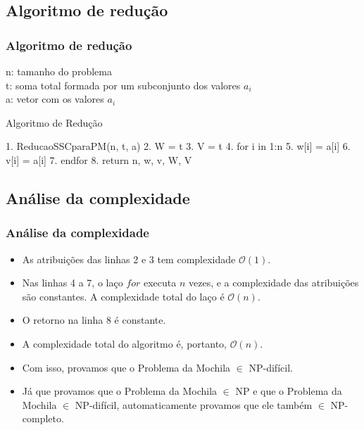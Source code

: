 \documentclass{beamer}
\begin{document}
\subsection{Algoritmo de redução}
\begin{frame}[fragile]
\frametitle{Algoritmo de redução}
    n: tamanho do problema \\
    t: soma total formada por um subconjunto dos valores $a_{i}$ \\
    a: vetor com os valores $a_{i}$ \\
    \begin{block}{Algoritmo de Redução}
        \begin{semiverbatim}
        1. ReducaoSSCparaPM(n, t, a)
        2.    W = t
        3.    V = t
        4.    for i in 1:n
        5.        w[i] = a[i]
        6.        v[i] = a[i]
        7.    endfor
        8.    return n, w, v, W, V
        \end{semiverbatim}
    \end{block}
\end{frame}


\subsection{Análise da complexidade}
\begin{frame}
\frametitle{Análise da complexidade}
    \begin{itemize}
        \item As atribuições das linhas 2 e 3 tem complexidade $\mathcal{O}(1)$.

        \item Nas linhas 4 a 7, o laço $for$ executa $n$ vezes, e a complexidade das atribuições são constantes.
            A complexidade total do laço é $\mathcal{O}(n)$.
        \item O retorno na linha 8 é constante.
        \item A complexidade total do algoritmo é, portanto, $\mathcal{O}(n)$.
        \item Com isso, provamos que o Problema da Mochila $\in$ NP-difícil.
        
        \item Já que provamos que o Problema da Mochila $\in$ NP e que o Problema da Mochila $\in$ NP-difícil, automaticamente provamos que ele também $\in$ NP-completo.
    \end{itemize}
\end{frame}
\end{document}
